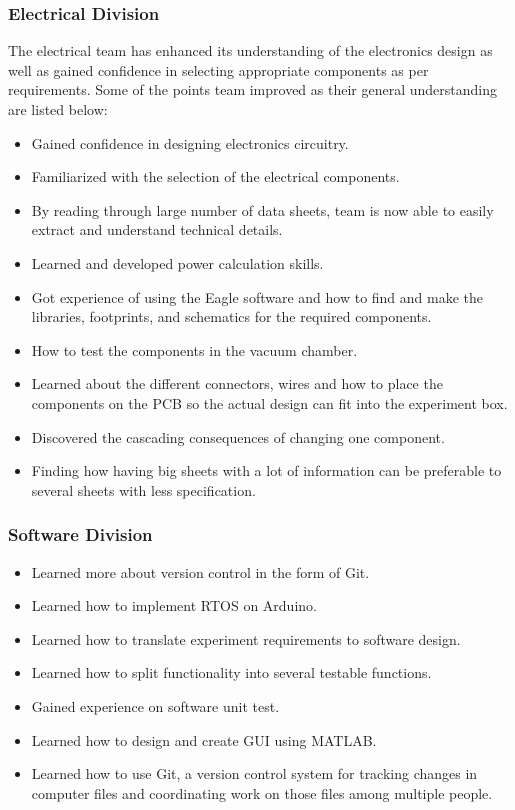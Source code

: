 \subsubsection{Electrical Division}
The electrical team has enhanced its understanding of the electronics design as well as gained confidence in selecting appropriate components as per requirements. Some of the points team improved as their general understanding are listed below:  
\begin{itemize}

    \item Gained confidence in designing electronics circuitry.
    \item Familiarized with the selection of the electrical components. 
    \item By reading through large number of data sheets, team is now able to easily extract and understand technical details. 
    \item Learned and developed power calculation skills.
    \item Got experience of using the Eagle software and how to find and make the libraries, footprints, and schematics for the required components.
    \item How to test the components in the vacuum chamber.
    \item Learned about the different connectors, wires and how to place the components on the PCB so the actual design can fit into the experiment box.
    \item Discovered the cascading consequences of changing one component.
    \item Finding how having big sheets with a lot of information can be preferable to several sheets with less specification.
\end{itemize}


\subsubsection{Software Division}

\begin{itemize}
    \item Learned more about version control in the form of Git.
    \item Learned how to implement RTOS on Arduino.
    \item Learned how to translate experiment requirements to software design.
    \item Learned how to split functionality into several testable functions.
    \item Gained experience on software unit test.
    \item Learned how to design and create GUI using MATLAB.
    \item Learned how to use Git, a version control system for tracking changes in computer files and coordinating work on those files among multiple people.
\end{itemize}



